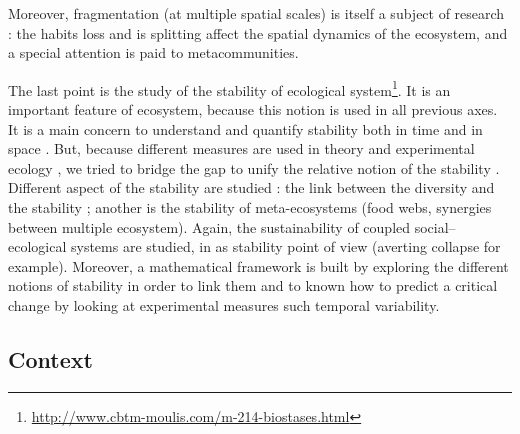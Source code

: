 \documentclass{article}
\begin{document}
Moreover, fragmentation (at multiple spatial scales) is itself a subject of research : the habits loss and is splitting affect the spatial dynamics of the ecosystem, and a special attention is paid to metacommunities. \cite{goncalves2018habitat}\cite{jacob2018habitat}

The last point is the study of the stability of ecological system\footnote{\url{http://www.cbtm-moulis.com/m-214-biostases.html}}. It is an important feature of ecosystem, because this notion is used in all previous axes. It is a main concern to understand and quantify stability both in time and in space \cite{wang2017invariability}\cite{zelnik2018impact}. But, because different measures are used in theory and experimental ecology , we tried to bridge the gap to unify the relative notion of the stability \cite{arnoldi2018ecosystems}\cite{barbier2019pyramids}.
Different aspect of the stability are studied : the link between the diversity and the stability \cite{vallina2017phytoplankton} ; another is the stability of meta-ecosystems (food webs, synergies between multiple ecosystem)\cite{arnoldi2016particularity}\cite{lurgi2016effects}\cite{wang2016biodiversity}. Again, the sustainability of coupled social–ecological systems are studied, in as stability point of view (averting collapse for example). Moreover, a mathematical framework is built by exploring the different notions of stability in order to link them \cite{arnoldi2018ecosystems}\cite{arnoldi2016unifying}\cite{donohue2016navigating} and to known how to predict a critical change by looking at experimental measures such temporal variability\cite{arnoldi2016resilience}\cite{haegeman2016resilience}\cite{wang2017invariability}. 










\newpage


\subsection*{Context}


\end{document}
